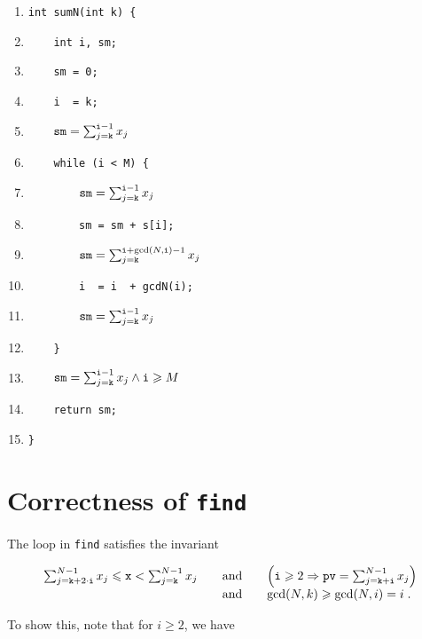 \documentclass{elsartNoFoot}
\newcommand{\1}{\color{red}}
\newcommand{\2}{\color{green}}
\renewcommand{\leq}{\leqslant}		\renewcommand{\geq}{\geqslant}
\newcommand{\X}[1]{x_{#1}}		\renewcommand{\S}[1]{s_{#1}}
\newcommand{\+}[3]{{\renewcommand{\i}{{#1}}{#3},\ldots,\renewcommand{\i}{{#2}}{#3}}}
\newcommand{\ti}{{\tt i}}		\newcommand{\tk}{{\tt k}}
\renewcommand{\exp}[1]{\gcd(N,#1)}
\begin{document}
\begin{enumerate}
\setlength{\itemsep}{-0.0cm}
\renewcommand{\labelenumi}{\arabic{enumi}.}
 \item{\1\verb|int sumN(int k) {				|
}\item{\1\verb|    int i, sm;					|
}\item{\1\verb|    sm = 0;					|
}\item{\1\verb|    i  = k;					|
}\item{\2\verb|    |${\tt sm} = \sum_{j=\tk}^{\ti-1} \X{j}$
}\item{\1\verb|    while (i < M) {				|
}\item{\2\verb|        |${\tt sm} = \sum_{j=\tk}^{\ti-1} \X{j}$
}\item{\1\verb|        sm = sm + s[i];				|
}\item{\2\verb|        |${\tt sm} = \sum_{j=\tk}^{\ti+\exp{\ti}-1} \X{j}$
}\item{\1\verb|        i  = i  + gcdN(i);			|
}\item{\2\verb|        |${\tt sm} = \sum_{j=\tk}^{\ti-1} \X{j}$
}\item{\1\verb|    }						|
}\item{\2\verb|    |${\tt sm} = \sum_{j=\tk}^{\ti-1} \X{j}
	\wedge \ti \geq M$
}\item{\1\verb|    return sm;					|
}\item{\1\verb|}						|
}
\end{enumerate}







\section{Correctness of {\tt find}}
\label{Correctness of find}

The loop in {\tt find} satisfies the invariant

\begin{eqnarray}
	\begin{array}{lll}
	\sum_{j=\tk+2 \cdot \ti}^{N-1} \X{j}
		\leq {\tt x}
		< \sum_{j=\tk}^{N-1} \X{j}
	& \mbox{ ~ and ~ } &
	\left( \ti \geq 2 \Rightarrow {\tt pv}
		= \sum_{j=\tk+\ti}^{N-1} \X{j} \right)	\\
	& \mbox{ ~ and ~ } & \exp{k} \geq \exp{i} = i \; .
	\end{array}
\label{findInv}
\end{eqnarray}

To show this, note that for $i \geq 2$, we have
\end{document}
